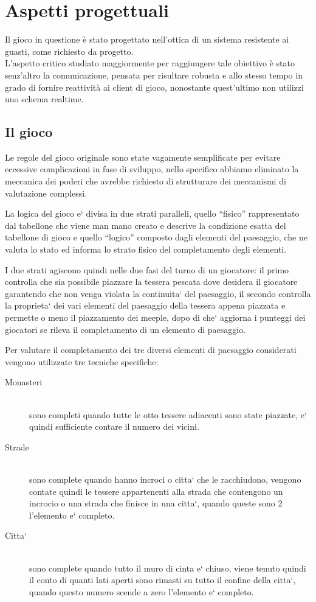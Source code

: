 \section{Aspetti progettuali}
Il gioco in questione è stato progettato nell'ottica di un sistema
resistente ai guasti, come richiesto da progetto.\\
L'aspetto critico studiato maggiormente per raggiungere tale
obiettivo è stato 
senz'altro la comunicazione, pensata per
risultare robusta e allo stesso tempo in grado di fornire reattività ai
client di gioco, nonostante quest'ultimo non utilizzi uno schema
realtime.

\subsection{Il gioco}
Le regole del gioco originale sono state vagamente semplificate per evitare eccessive complicazioni in fase di sviluppo, nello specifico abbiamo eliminato la meccanica dei poderi che avrebbe richiesto di strutturare dei meccanismi di valutazione complessi.

La logica del gioco e` divisa in due strati paralleli, quello ``fisico'' rappresentato dal tabellone che viene man mano creato e descrive la condizione esatta del tabellone di gioco e quello ``logico'' composto dagli elementi del paesaggio, che ne valuta lo stato ed informa lo strato fisico del completamento degli elementi.

I due strati agiscono quindi nelle due fasi del turno di un giocatore: il primo controlla che sia possibile piazzare la tessera pescata dove desidera il giocatore garantendo che non venga violata la continuita` del paesaggio, il secondo controlla la proprieta` dei vari elementi del paesaggio della tessera appena piazzata e permette o meno il piazzamento dei meeple, dopo di che` aggiorna i punteggi dei giocatori se rileva il completamento di un elemento di paesaggio.

Per valutare il completamento dei tre diversi elementi di paesaggio considerati vengono utilizzate tre tecniche specifiche:
\begin{description}
	\item[Monasteri] \hfill \\
		sono completi quando tutte le otto tessere adiacenti sono state piazzate, e` quindi sufficiente contare il numero dei vicini.
	\item[Strade] \hfill \\
		sono complete quando hanno incroci o citta` che le racchiudono, vengono contate quindi le tessere appartenenti alla strada che contengono un incrocio o una strada che finisce in una citta`, quando queste sono 2 l'elemento e` completo.
\item[Citta`] \hfill \\
		sono complete quando tutto il muro di cinta e` chiuso, viene tenuto quindi il conto di quanti lati aperti sono rimasti su tutto il confine della citta`, quando questo numero scende a zero l'elemento e` completo.
\end{description}

